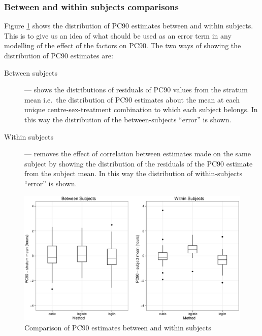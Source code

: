 \subsubsection*{Between and within subjects comparisons}
Figure \ref{methodsbysubject} shows the distribution of PC90 estimates between and within subjects. This is to give us an idea of what should be used as an error term in any modelling of the effect of the factors on PC90. The two ways of showing the distribution of PC90 estimates are:
\begin{description}
\item[Between subjects] --- shows the distributions of residuals of PC90 values from the stratum mean i.e.\  the distribution of PC90 estimates about the mean at each unique centre-sex-treatment combination to which each subject belongs. In this way the distribution of the between-subjects ``error'' is shown.
\item[Within subjects] --- removes the effect of correlation between estimates made on the same subject by showing the distribution of the residuals of the PC90 estimate from the subject mean. In this way the distribution of within-subjects ``error'' is shown.
\end{description}
\begin{figure}[h]
\includegraphics[width=150mm]{methodsbysubject.eps} 
\caption{Comparison of PC90 estimates between and within subjects}
\label{methodsbysubject}
\end{figure}


